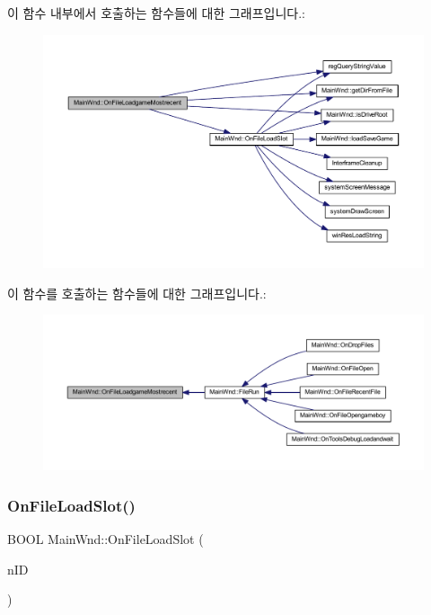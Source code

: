 이 함수 내부에서 호출하는 함수들에 대한 그래프입니다.\+:
\nopagebreak
\begin{figure}[H]
\begin{center}
\leavevmode
\includegraphics[width=350pt]{class_main_wnd_aafa7776c35ba50c4244cb22650f15337_cgraph}
\end{center}
\end{figure}
이 함수를 호출하는 함수들에 대한 그래프입니다.\+:
\nopagebreak
\begin{figure}[H]
\begin{center}
\leavevmode
\includegraphics[width=350pt]{class_main_wnd_aafa7776c35ba50c4244cb22650f15337_icgraph}
\end{center}
\end{figure}
\mbox{\label{class_main_wnd_a84c4154350bd26b393fcd82948d342e1}} 
\subsubsection{\texorpdfstring{On\+File\+Load\+Slot()}{OnFileLoadSlot()}}
{\footnotesize\ttfamily B\+O\+OL Main\+Wnd\+::\+On\+File\+Load\+Slot (\begin{DoxyParamCaption}\item[{U\+I\+NT}]{n\+ID }\end{DoxyParamCaption})\hspace{0.3cm}{\ttfamily [protected]}}



